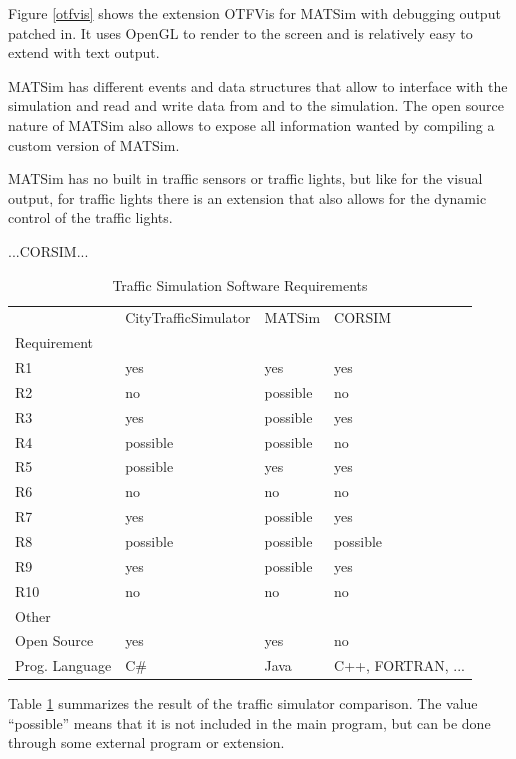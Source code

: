 
Figure \ref{otfvis} shows the extension OTFVis for MATSim with debugging output patched in. It uses OpenGL to render to the screen and is relatively easy to extend with text output.

MATSim has different events and data structures that allow to interface with the simulation and read and write data from and to the simulation. The open source nature of MATSim also allows to expose all information wanted by compiling a custom version of MATSim.

MATSim has no built in traffic sensors or traffic lights, but like for the visual output, for traffic lights there is an extension that also allows for the dynamic control of the traffic lights.

...CORSIM...


\begin{table}[!ht]
  	\centering
  	\begin{tabular}{l|l|l|l}
		 & CityTrafficSimulator & MATSim & CORSIM \\[10pt]
		Requirement & & & \\[10pt]
		R1 & yes & yes & yes \\[10pt]
		R2 & no & possible & no \\[10pt]
		R3 & yes & possible & yes \\[10pt]
		R4 & possible & possible & no \\[10pt]
		R5 & possible & yes & yes \\[10pt]
		R6 & no & no & no \\[10pt]
		R7 & yes & possible & yes \\[10pt]
		R8 & possible & possible & possible \\[10pt]
		R9 & yes & possible & yes \\[10pt]
		R10 & no & no & no \\[10pt]
		Other & & & \\[10pt]
		Open Source & yes & yes & no \\[10pt]
		Prog. Language & C\# & Java & C++, FORTRAN, ... \\[10pt]
	\end{tabular}
  	\caption{Traffic Simulation Software Requirements}
  	\label{simulationRequirementsComparison}
\end{table}

Table \ref{simulationRequirementsComparison} summarizes the result of the traffic simulator comparison. The value ``possible'' means that it is not included in the main program, but can be done through some external program or extension.

